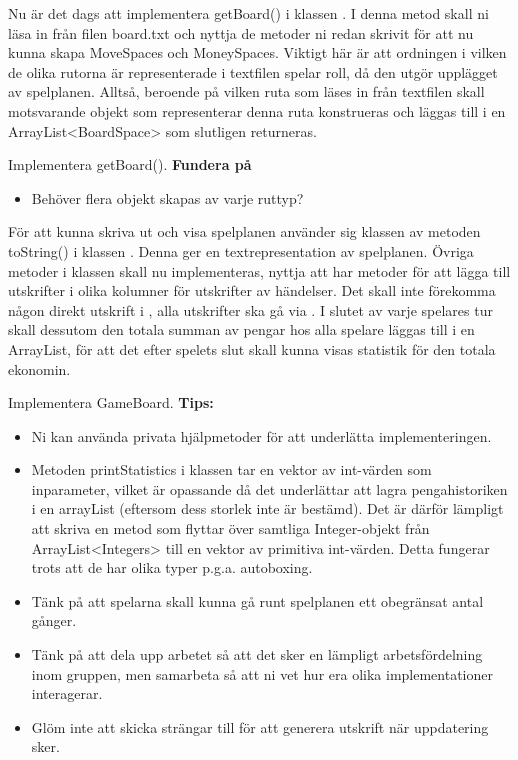 \Task Nu är det dags att implementera getBoard() i klassen . I denna metod skall ni läsa in från filen board.txt och nyttja de metoder ni redan skrivit för att nu kunna skapa MoveSpaces och MoneySpaces. Viktigt här är att ordningen i vilken de olika rutorna är representerade i textfilen spelar roll, då den utgör upplägget av spelplanen. Alltså, beroende på vilken ruta som läses in från textfilen skall motsvarande objekt som representerar denna ruta konstrueras och läggas till i en ArrayList<BoardSpace> som slutligen returneras.


\Subtask Implementera getBoard().
\newline
\newline
\textbf{Fundera på}
\begin{itemize}
\item Behöver flera objekt skapas av varje ruttyp?
\end{itemize}

\Task För att kunna skriva ut och visa spelplanen använder sig klassen   av metoden toString() i klassen . Denna ger en textrepresentation av spelplanen. Övriga metoder i klassen  skall nu implementeras, nyttja att   har metoder för att lägga till utskrifter i olika kolumner för utskrifter av händelser. Det skall inte förekomma någon direkt utskrift i  , alla utskrifter ska gå via . I slutet av varje spelares tur skall dessutom den totala summan av pengar hos alla spelare läggas till i en ArrayList, för att det efter spelets slut skall kunna visas statistik för den totala ekonomin. 

\Subtask Implementera GameBoard.
\newline
\newline
\textbf{Tips:}

\begin{itemize}
\item Ni kan använda privata hjälpmetoder för att underlätta implementeringen.
\item Metoden printStatistics i klassen  tar en vektor av int-värden som inparameter, vilket är opassande då det underlättar att lagra pengahistoriken i en arrayList (eftersom dess storlek inte är bestämd). Det är därför lämpligt att skriva en metod som flyttar över samtliga Integer-objekt från ArrayList<Integers> till en vektor av primitiva int-värden. Detta fungerar trots att de har olika typer p.g.a. autoboxing. 
\item Tänk på att spelarna skall kunna gå runt spelplanen ett obegränsat antal gånger.
\item Tänk på att dela upp arbetet så att det sker en lämpligt arbetsfördelning inom gruppen, men samarbeta så att ni vet hur era olika implementationer interagerar.
\item Glöm inte att skicka strängar till   för att generera utskrift när uppdatering sker.
\end{itemize}

